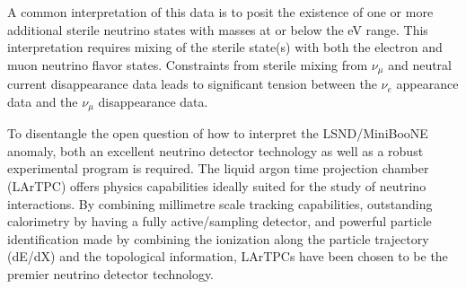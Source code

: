 A common interpretation of this data is to posit the existence of one or more additional sterile neutrino states with masses at or below the eV range. This interpretation requires mixing of the sterile state(s) with both the electron and muon neutrino flavor states. Constraints from sterile mixing from $\nu_{\mu}$ and neutral current disappearance data \cite{No18, No19} leads to significant tension between the $\nu_{e}$ appearance data and the $\nu_{\mu}$ disappearance data. 

To disentangle the open question of how to interpret the LSND/MiniBooNE anomaly, both an excellent neutrino detector technology as well as a robust experimental program is required.  The liquid argon time projection chamber (LArTPC) offers physics capabilities ideally suited for the study of neutrino interactions. By combining millimetre scale tracking capabilities, outstanding calorimetry by having a fully active/sampling detector, and powerful particle identification made by combining the ionization along the particle trajectory (dE/dX) and the topological information, LArTPCs have been chosen to be the premier neutrino detector technology. 


